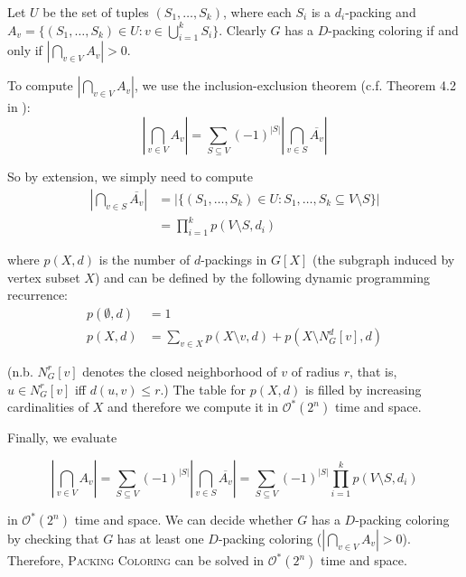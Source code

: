 \documentclass[12pt, a4paper]{article}
\theoremstyle{definition}
\newcommand{\mcO}{\mathcal{O}}
\begin{document}
Let $U$ be the set of tuples $(S_1, \dotsc, S_k)$, where each $S_i$ is a $d_i$-packing and $A_v = \{ (S_1, \dotsc, S_k) \in U : v \in \bigcup_{i=1}^{k} S_i\}$. Clearly $G$ has a $D$-packing coloring if and only if $\left | \bigcap_{v \in V} A_v \right | > 0$.

To compute $\left | \bigcap_{v \in V} A_v \right |$, we use the inclusion-exclusion theorem (c.f. Theorem 4.2 in \cite{Fomin2010}):
\begin{equation} \label{eq:incl_excl}
	\left | \bigcap_{v \in V} A_v \right | = \sum_{S \subseteq V} (-1)^{|S|} \left | \bigcap_{v \in S} \overline{A_v} \right | 
\end{equation}

So by extension, we simply need to compute 
\begin{align*}
	\left | \bigcap_{v \in S} \overline{A_v} \right | &= \left | \{ (S_1, \dotsc, S_k) \in U : S_1, \dotsc, S_k \subseteq V \setminus S \} \right | \\
													  &= \prod_{i=1}^{k} p(V \setminus S, d_i)
\end{align*}

where $p(X, d)$ is the number of $d$-packings in $G[X]$ (the subgraph induced by vertex subset $X$) and can be defined by the following dynamic programming recurrence:
\begin{align*}
	p(\emptyset, d) &= 1 \\
	p(X, d) &= \sum_{v \in X} p(X \setminus {v}, d) + p(X \setminus N_G^d[v], d)   
\end{align*}

(n.b. $N_G^r[v]$ denotes the closed neighborhood of $v$ of radius $r$, that is, $u \in N_G^r[v]$ iff $d(u, v) \leq r$.) The table for $p(X, d)$ is filled by increasing cardinalities of $X$ and therefore we compute it in $\mcO^*(2^n)$ time and space. 

Finally, we evaluate

\begin{equation} \label{eq:incl_excl_final}
	\left | \bigcap_{v \in V} A_v \right | 
	= \sum_{S \subseteq V} (-1)^{|S|} \left | \bigcap_{v \in S} \overline{A_v} \right | 
	= \sum_{S \subseteq V} (-1)^{|S|} \prod_{i=1}^{k} p(V \setminus S, d_i)
\end{equation}

in $\mcO^*(2^n)$ time and space. We can decide whether $G$ has a $D$-packing coloring by checking that $G$ has at least one $D$-packing coloring ($\left | \bigcap_{v \in V} A_v \right | > 0$). Therefore, \textsc{Packing Coloring} can be solved in $\mcO^*(2^n)$ time and space.
\end{document}
